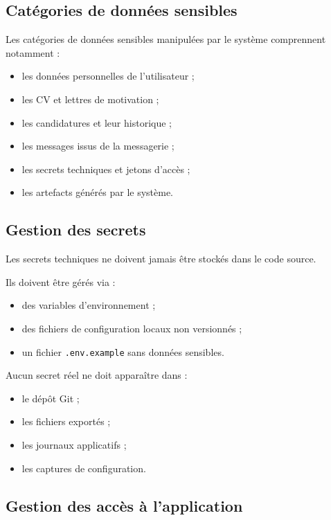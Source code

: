 \documentclass[11pt,a4paper]{article}
\begin{document}
\subsection{Catégories de données sensibles}

Les catégories de données sensibles manipulées par le système comprennent notamment :

\begin{itemize}
    \item les données personnelles de l’utilisateur ;
    \item les CV et lettres de motivation ;
    \item les candidatures et leur historique ;
    \item les messages issus de la messagerie ;
    \item les secrets techniques et jetons d’accès ;
    \item les artefacts générés par le système.
\end{itemize}

\subsection{Gestion des secrets}

Les secrets techniques ne doivent jamais être stockés dans le code source.

Ils doivent être gérés via :

\begin{itemize}
    \item des variables d’environnement ;
    \item des fichiers de configuration locaux non versionnés ;
    \item un fichier \texttt{.env.example} sans données sensibles.
\end{itemize}

Aucun secret réel ne doit apparaître dans :

\begin{itemize}
    \item le dépôt Git ;
    \item les fichiers exportés ;
    \item les journaux applicatifs ;
    \item les captures de configuration.
\end{itemize}

\subsection{Gestion des accès à l’application}
\end{document}
